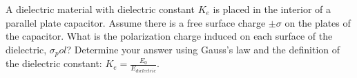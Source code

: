 \documentclass[11pt,letterpaper,boxed]{hmcpset}
\begin{document}
	\begin{solution}
	\vfill
	\end{solution}
	\newpage

	\begin{problem} [Problem 6]
		A dielectric material with dielectric constant $K_e$ is placed in the interior of a parallel plate capacitor. Assume there is a free surface charge $\pm \sigma$ on the plates of the capacitor. What is the polarization charge induced on each surface of the dielectric, $\sigma_pol$? Determine your answer using Gauss's law and the definition of the dielectric constant: $K_e = \frac{E_0}{E_{dielectric}}$.
	\end{problem}
	
	\begin{solution}
	\vfill
	\end{solution}
	\newpage
\end{document}
